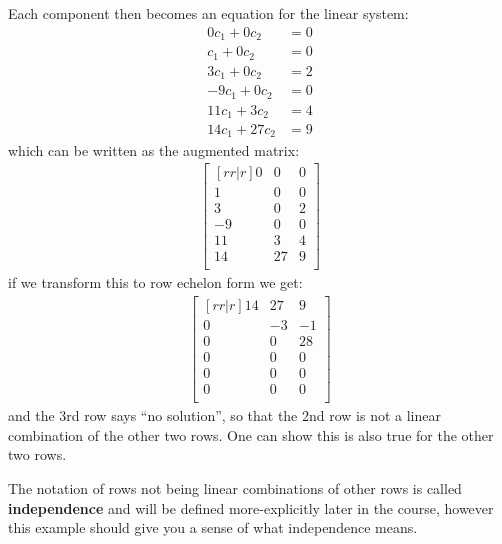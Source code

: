 Each component then becomes an equation for the linear system:
%
\begin{align*}
0 c_1 + 0 c_2 & = 0 \\
c_1 + 0 c_2 & = 0 \\
3 c_1 + 0 c_2 & = 2 \\
-9 c_1 + 0 c_2 & = 0 \\
11 c_1 + 3 c_2 & = 4 \\
14 c_1 + 27 c_2 & = 9
\end{align*}
which can be written as the augmented matrix:
%
\begin{align*}
\begin{bmatrix}[rr|r]
0 & 0 & 0 \\
1 & 0 & 0 \\
3 & 0 & 2 \\
-9 & 0 & 0 \\
11 & 3 & 4 \\
14 & 27 & 9\\
\end{bmatrix}
\end{align*}
if we transform this to row echelon form we get:
%
\begin{align*}
\begin{bmatrix}[rr|r]
14 & 27 & 9\\
0 & -3 & -1\\
0 & 0 & 28\\
0 & 0 & 0\\
0 & 0 & 0\\
0 & 0 & 0\\
\end{bmatrix}
\end{align*}
and the 3rd row says ``no solution'', so that the 2nd row is not a linear combination of the other two rows.  One can show this is also true for the other two rows.

The notation of rows not being linear combinations of other rows is called \textbf{independence} and will be defined more-explicitly later in the course, however this example should give you a sense of what independence means.

